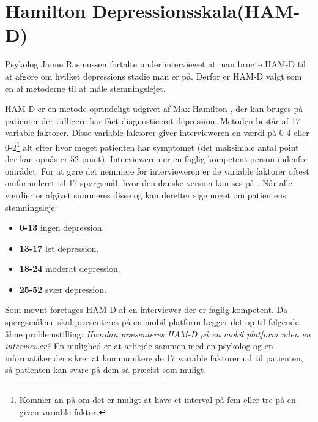 \section{Hamilton Depressionsskala(HAM-D)}
Psykolog Janne Rasmussen fortalte under interviewet at man brugte HAM-D til at afgøre om hvilket depressions stadie man er på.\cite[Afsnit 1.3, Møde med Psykolog Janne Rasmussen]{faelles}
Derfor er HAM-D valgt som en af metoderne til at måle stemningslejet.

HAM-D er en metode oprindeligt udgivet af Max Hamilton \cite{ham_d}, der kan bruges på patienter der tidligere har fået diagnosticeret depression. 
Metoden består af 17 variable faktorer.
Disse variable faktorer giver intervieweren en værdi på 0-4 eller 0-2\footnote{Kommer an på om det er muligt at have et interval på fem eller tre på en given variable faktor.} alt efter hvor meget patienten har symptomet (det maksimale antal point der kan opnås er 52 point).
Intervieweren er en faglig kompetent person indenfor området.
For at gøre det nemmere for intervieweren er de variable faktorer oftest omformuleret til 17 spørgsmål, hvor den danske version kan ses på \citet{ham_d_dansk}.
Når alle værdier er afgivet summeres disse og kan derefter sige noget om patientens stemningsleje:
\begin{itemize}
	\item \textbf{0-13} ingen depression.
	\item \textbf{13-17} let depression.
	\item \textbf{18-24} moderat depression.
	\item \textbf{25-52} svær depression.
\end{itemize}

Som nævnt foretages HAM-D af en interviewer der er faglig kompetent.
Da spørgsmålene skal præsenteres på en mobil platform lægger det op til følgende åbne problemstilling: \textit{Hvordan præsenteres HAM-D på en mobil platform uden en interviewer?}
En mulighed er at arbejde sammen med en psykolog og en informatiker der sikrer at kommunikere de 17 variable faktorer ud til patienten, så patienten kan svare på dem så præcist som muligt.

